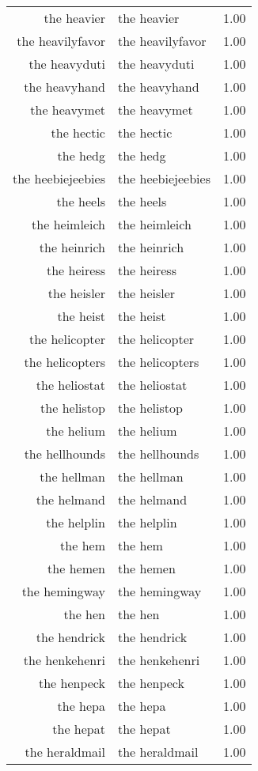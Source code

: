 \begin{table}[ht]
\begin{tabular}{rlr}
  the heavier & the heavier & 1.00 \\ 
  the heavilyfavor & the heavilyfavor & 1.00 \\ 
  the heavyduti & the heavyduti & 1.00 \\ 
  the heavyhand & the heavyhand & 1.00 \\ 
  the heavymet & the heavymet & 1.00 \\ 
  the hectic & the hectic & 1.00 \\ 
  the hedg & the hedg & 1.00 \\ 
  the heebiejeebies & the heebiejeebies & 1.00 \\ 
  the heels & the heels & 1.00 \\ 
  the heimleich & the heimleich & 1.00 \\ 
  the heinrich & the heinrich & 1.00 \\ 
  the heiress & the heiress & 1.00 \\ 
  the heisler & the heisler & 1.00 \\ 
  the heist & the heist & 1.00 \\ 
  the helicopter & the helicopter & 1.00 \\ 
  the helicopters & the helicopters & 1.00 \\ 
  the heliostat & the heliostat & 1.00 \\ 
  the helistop & the helistop & 1.00 \\ 
  the helium & the helium & 1.00 \\ 
  the hellhounds & the hellhounds & 1.00 \\ 
  the hellman & the hellman & 1.00 \\ 
  the helmand & the helmand & 1.00 \\ 
  the helplin & the helplin & 1.00 \\ 
  the hem & the hem & 1.00 \\ 
  the hemen & the hemen & 1.00 \\ 
  the hemingway & the hemingway & 1.00 \\ 
  the hen & the hen & 1.00 \\ 
  the hendrick & the hendrick & 1.00 \\ 
  the henkehenri & the henkehenri & 1.00 \\ 
  the henpeck & the henpeck & 1.00 \\ 
  the hepa & the hepa & 1.00 \\ 
  the hepat & the hepat & 1.00 \\ 
  the heraldmail & the heraldmail & 1.00 \\ 

\end{tabular}
\end{table}
